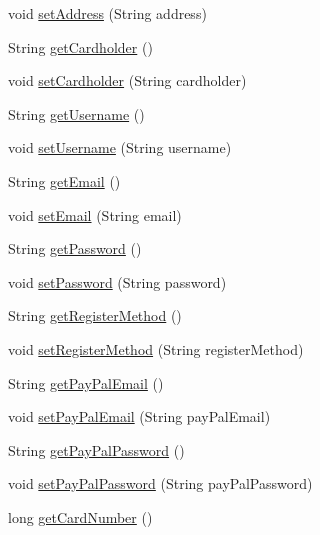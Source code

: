 \begin{DoxyCompactItemize}
\item 
void \mbox{\hyperlink{class_s_p_q_1_1data_1_1_user_ab6e40ae379cda1d98a5873365df30736}{set\+Address}} (String address)
\item 
String \mbox{\hyperlink{class_s_p_q_1_1data_1_1_user_a6184a8aa1ccfc02796356f648ebf37ee}{get\+Cardholder}} ()
\item 
void \mbox{\hyperlink{class_s_p_q_1_1data_1_1_user_a0fe49415c82bbbbfa0b22822f054157f}{set\+Cardholder}} (String cardholder)
\item 
String \mbox{\hyperlink{class_s_p_q_1_1data_1_1_user_a55d2e322edbbe446287ce25baecdd421}{get\+Username}} ()
\item 
void \mbox{\hyperlink{class_s_p_q_1_1data_1_1_user_ab173655f6fbe57a59cd0da8d0cfbed06}{set\+Username}} (String username)
\item 
String \mbox{\hyperlink{class_s_p_q_1_1data_1_1_user_a4f3ae0062ee7529314a5b791707ff4b4}{get\+Email}} ()
\item 
void \mbox{\hyperlink{class_s_p_q_1_1data_1_1_user_ab7132f971882fb88afc6999cf5473ef4}{set\+Email}} (String email)
\item 
String \mbox{\hyperlink{class_s_p_q_1_1data_1_1_user_a688c1eadd21594d52967d87289e23ce2}{get\+Password}} ()
\item 
void \mbox{\hyperlink{class_s_p_q_1_1data_1_1_user_aa5bcf362d3c9c4746f406239bcb041f5}{set\+Password}} (String password)
\item 
String \mbox{\hyperlink{class_s_p_q_1_1data_1_1_user_a4a336e889bfdefbd439134b27e8873fc}{get\+Register\+Method}} ()
\item 
void \mbox{\hyperlink{class_s_p_q_1_1data_1_1_user_a6519805f5204c8d1add91a917634f588}{set\+Register\+Method}} (String register\+Method)
\item 
String \mbox{\hyperlink{class_s_p_q_1_1data_1_1_user_ad3a5ab9fa36272afbc99e7ebfc7de108}{get\+Pay\+Pal\+Email}} ()
\item 
void \mbox{\hyperlink{class_s_p_q_1_1data_1_1_user_abe8156eec92d2d94d290b96af8e8ea94}{set\+Pay\+Pal\+Email}} (String pay\+Pal\+Email)
\item 
String \mbox{\hyperlink{class_s_p_q_1_1data_1_1_user_aa3a0bdf1676addb67307fa9a66495fa4}{get\+Pay\+Pal\+Password}} ()
\item 
void \mbox{\hyperlink{class_s_p_q_1_1data_1_1_user_a61ca04ab3f3c854aa272f3097b355eb9}{set\+Pay\+Pal\+Password}} (String pay\+Pal\+Password)
\item 
long \mbox{\hyperlink{class_s_p_q_1_1data_1_1_user_ab847d5c61fe4980ae2a15a537b22939b}{get\+Card\+Number}} ()

\end{DoxyCompactItemize}
